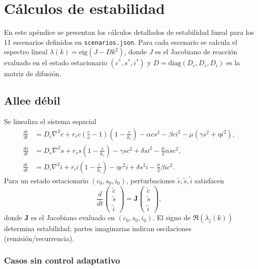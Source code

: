 \chapter{Cálculos de estabilidad}
\label{ap:estabilidad}

En este apéndice se presentan los cálculos detallados de estabilidad lineal para los 11 escenarios definidos en \texttt{scenarios.json}. Para cada escenario se calcula el espectro lineal $\lambda(k)=\mathrm{eig}(J-Dk^2)$, donde $J$ es el Jacobiano de reacción evaluado en el estado estacionario $(c^*,s^*,i^*)$ y $D=\mathrm{diag}(D_c,D_s,D_i)$ es la matriz de difusión.

\section{Allee débil}

Se linealiza el sistema espacial
\begin{align}
    \frac{dc}{dt} &= D_c \nabla^2 c + r_c c \left( \frac{c}{a} - 1 \right)\left(1 - \frac{c}{k_c} \right) - \alpha c s^2 - \beta c i^2 - \mu ( \gamma s^2 + \eta i^2), \label{eqn:cancer_dynamic_spatial_app} \\
    \frac{ds}{dt} &= D_s \nabla^2 s + r_s s \left(1 - \frac{s}{k_s} \right) - \gamma s c^2 + \delta s i^2 - \frac{\mu}{2} \alpha s c^2, \label{eqn:sano_dynamic_spatial_app} \\
    \frac{di}{dt} &= D_i \nabla^2 i + r_i i \left(1 - \frac{i}{k_i} \right) - \eta c^2 i + \delta s^2 i - \frac{\mu}{2} \beta i c^2. \label{eqn:inmune_dynamic_spatial_app}
\end{align}
Para un estado estacionario $(c_0, s_0, i_0)$, perturbaciones $\tilde{c},\tilde{s},\tilde{i}$ satisfacen
\[
\frac{d}{dt}
\begin{pmatrix}
 \tilde{c} \\
 \tilde{s} \\
 \tilde{i}
\end{pmatrix}
= 
\mathbf{J}
\begin{pmatrix}
 \tilde{c} \\
 \tilde{s} \\
 \tilde{i}
\end{pmatrix},
\]
donde $\mathbf{J}$ es el Jacobiano evaluado en $(c_0,s_0,i_0)$. El signo de $\Re(\lambda_j(k))$ determina estabilidad; partes imaginarias indican oscilaciones (remisión/recurrencia).

\subsection{Casos sin control adaptativo}

